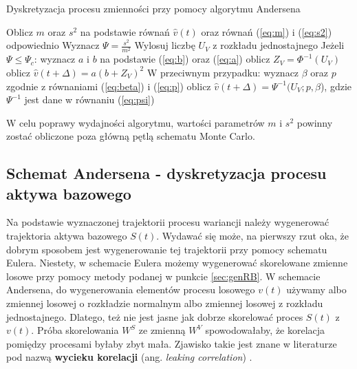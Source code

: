 \documentclass{pracamgr}
\begin{document}
\begin{algorithm}[H]
\caption{Dyskretyzacja procesu zmienności przy pomocy algorytmu Andersena}\label{andersenAlgorithmLabel}

\begin{algorithmic}[1]
 
  \State Oblicz $m$ oraz $s^2$ na podstawie równań $\hat{v}(t)$ oraz równań (\ref{eq:m}) i (\ref{eq:s2}) odpowiednio
  \State Wyznacz $\Psi = \frac{s^2}{m^2}$ 
  \State Wylosuj liczbę $U_V$ z rozkładu jednostajnego 
  \State Jeżeli $\Psi \leq \Psi_c$:
  \State \hspace{\algorithmicindent} wyznacz $a$ i $b$ na podstawie (\ref{eq:b}) oraz (\ref{eq:a})
  \State \hspace{\algorithmicindent} oblicz $Z_V = \Phi^{-1}(U_V)$
  \State \hspace{\algorithmicindent} oblicz $\hat{v}(t + \Delta)  = a(b+ Z_V)^2$
  \State W przeciwnym przypadku:
  \State \hspace{\algorithmicindent} wyznacz $\beta$ oraz $p$ zgodnie z równaniami (\ref{eq:beta}) i (\ref{eq:p})
  \State \hspace{\algorithmicindent} oblicz $\hat{v}(t + \Delta)  =\Psi^{-1}(U_V;p,\beta$), 
                                     gdzie $\Psi^{-1}$ jest dane w równaniu (\ref{eq:psi})
\end{algorithmic}
\label{alg:andersenAlgorithm}
\end{algorithm}



W celu poprawy wydajności algorytmu, wartości parametrów $m$ i $s^2$ powinny zostać obliczone poza 
główną pętlą schematu Monte Carlo.



\subsection{Schemat Andersena - dyskretyzacja procesu aktywa bazowego}

Na podstawie wyznaczonej trajektorii procesu wariancji należy wygenerować trajektoria aktywa bazowego 
$S(t)$. Wydawać się może, na pierwszy rzut oka, że dobrym sposobem jest wygenerowanie tej trajektorii 
przy pomocy schematu Eulera. Niestety, w schemacie Eulera możemy wygenerować skorelowane zmienne 
losowe przy pomocy metody podanej w punkcie \ref{sec:genRB}.
W schemacie Andersena, do wygenerowania elementów procesu losowego $v(t)$ używamy albo zmiennej 
losowej o rozkładzie normalnym albo zmiennej losowej z rozkładu jednostajnego. Dlatego, też nie jest 
jasne jak dobrze skorelować proces $S(t)$ z $v(t)$. Próba skorelowania $W^S$ ze zmienną $W^V$
spowodowałaby, że korelacja pomiędzy procesami byłaby zbyt mała. Zjawisko takie jest znane w 
literaturze pod nazwą \textbf{wycieku korelacji} 
(ang. \textit{leaking correlation}) \cite{Andersen}. 
\end{document}
